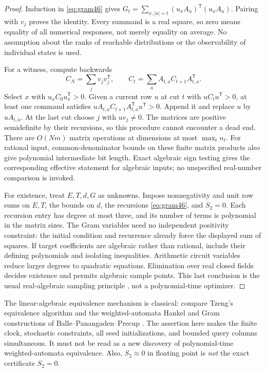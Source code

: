 \begin{proof}
Induction in \eqref{eq:gram46} gives
$G_t=\sum_{x,|u|=t}(u_xA_u)^{\mathsf T}(u_xA_u)$.
Pairing with $v_j$ proves the identity. Every summand is a real square,
so zero means equality of all numerical responses, not merely equality
on average. No assumption about the ranks of reachable distributions
or the observability of individual states is used.

For a witness, compute backwards
\[
 C_N=\sum_jv_jv_j^{\mathsf T},\qquad
 C_t=\sum_a A_{t,a}C_{t+1}A_{t,a}^{\mathsf T}.
\]
Select $x$ with $u_xC_0u_x^{\mathsf T}>0$. Given a current row $u$ at
cut $t$ with $uC_tu^{\mathsf T}>0$, at least one command satisfies
$uA_{t,a}C_{t+1}A_{t,a}^{\mathsf T}u^{\mathsf T}>0$.
Append it and replace $u$ by $uA_{t,a}$. At the last cut choose $j$
with $uv_j\ne0$. The matrices are positive semidefinite by their
recursions, so this procedure cannot encounter a dead end.
There are $O(Nm)$ matrix operations at dimensions at most
$\max_t n_t$. For rational input, common-denominator bounds on these
finite matrix products also give polynomial intermediate bit length.
Exact algebraic sign testing gives the corresponding effective
statement for algebraic inputs; no unspecified real-number comparison
is invoked.

For existence, treat $E,T,d,G$ as unknowns. Impose nonnegativity and
unit row sums on $E,T$, the bounds on $d$, the recursions
\eqref{eq:gram46}, and $S_2=0$. Each recursion entry has degree at most
three, and its number of terms is polynomial in the matrix sizes.
The Gram variables need no independent positivity constraint: the
initial condition and recurrence already force the displayed sum of
squares. If target coefficients are algebraic rather than rational,
include their defining polynomials and isolating inequalities. Arithmetic
circuit variables reduce larger degrees to quadratic equations.
Elimination over real closed fields decides existence and permits
algebraic sample points. This last conclusion is the usual
real-algebraic sampling principle \cite{BPR}, not a polynomial-time optimizer.
\end{proof}

The linear-algebraic equivalence mechanism is classical: compare
Tzeng's equivalence algorithm \cite{Tzeng92} and the weighted-automata
Hankel and Gram constructions of Balle--Panangaden--Precup
\cite{BPP15}. The assertion here makes the finite clock, stochastic
constraints, all seed initializations, and bounded query columns
simultaneous. It must not be read as a new discovery of polynomial-time
weighted-automata equivalence. Also, $S_2\approx0$ in floating point is
\emph{not} the exact certificate $S_2=0$.

